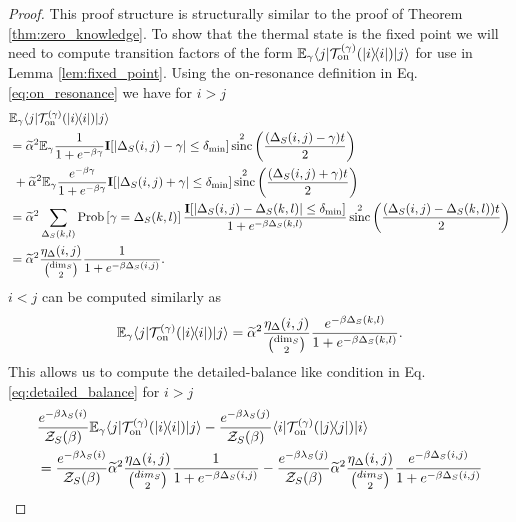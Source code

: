 \documentclass[
 amsmath,amssymb,
 aps,
onecolumn, 
nofootinbib]{revtex4-2}
\newcommand{\on}{\rm on}
\newcommand{\ket}[1]{|#1\rangle}
\newcommand{\bra}[1]{\langle #1|}
\newcommand{\ketbra}[2]{| #1\rangle\! \langle #2|}
\newcommand{\EE}{\mathbb{E}}
\newcommand{\TT}{\mathcal{T}}
\newcommand{\prob}[1]{{\rm Prob}\left[ #1 \right]}
\newcommand{\partfun}{\mathcal{Z}}
\DeclareMathOperator{\sinc}{sinc}
\begin{document}
\begin{proof}
This proof structure is structurally similar to the proof of Theorem \ref{thm:zero_knowledge}.
To show that the thermal state is the fixed point we will need to compute transition factors of the form $\EE_\gamma \bra{j}\TT_{\on}^{(\gamma)}(\ketbra{i}{i})\ket{j}$ for use in Lemma \ref{lem:fixed_point}. Using the on-resonance definition in Eq. \eqref{eq:on_resonance} we have for $i > j$
\begin{align}
    &\EE_\gamma \bra{j} \TT_{\on}^{(\gamma)}(\ketbra{i}{i})\ket{j} \nonumber \\
    &=  \widetilde{\alpha}^2 \EE_{\gamma} \frac{1}{1 + e^{-\beta \gamma}} \mathbf{I}[|\Delta_S(i,j) - \gamma| \le \delta_{\min}]  \sinc^2\left(\frac{(\Delta_S(i,j) - \gamma)t}{2}\right) \nonumber \\
    &~+ \widetilde{\alpha}^2 \EE_{\gamma} \frac{e^{-\beta \gamma}}{1 + e^{-\beta \gamma}} \mathbf{I}[|\Delta_S(i,j) + \gamma| \le \delta_{\min}]  \sinc^2\left(\frac{(\Delta_S(i,j) + \gamma)t}{2}\right) \\
    &= \widetilde{\alpha}^2 \sum_{\Delta_S(k,l)} \prob{\gamma = \Delta_S(k,l)} \frac{\mathbf{I}[|\Delta_S(i,j) - \Delta_S(k,l)| \le \delta_{\min}]}{1 + e^{-\beta \Delta_S(k,l)}}   \sinc^2\left(\frac{(\Delta_S(i,j) - \Delta_S(k,l))t}{2}\right) \\
    &= \widetilde{\alpha}^2 \frac{\eta_\Delta(i,j)}{\binom{\dim_S}{2}} \frac{1}{1 + e^{-\beta \Delta_S(i,j)}}.
\end{align}
$i < j$ can be computed similarly as
\begin{equation}
    \EE_\gamma \bra{j} \TT_{\on}^{(\gamma)}(\ketbra{i}{i})\ket{j} = \widetilde{\alpha}^2 \frac{\eta_\Delta(i,j)}{\binom{\dim_S}{2}} \frac{e^{-\beta \Delta_S(k,l)}}{1 + e^{-\beta \Delta_S(k,l)}}.
\end{equation}
This allows us to compute the detailed-balance like condition in Eq. \eqref{eq:detailed_balance} for $i > j$
\begin{align}
    &\frac{e^{-\beta \lambda_S(i)}}{\partfun_S(\beta)} \EE_\gamma \bra{j} \TT_{\on}^{(\gamma)}(\ketbra{i}{i}) \ket{j} - \frac{e^{-\beta \lambda_S(j)}}{\partfun_S(\beta)} \bra{i} \TT_{\on}^{(\gamma)}(\ketbra{j}{j}) \ket{i} \nonumber \\
    &= \frac{e^{-\beta \lambda_S(i)}}{\partfun_S(\beta)} \widetilde{\alpha}^2 \frac{\eta_\Delta(i,j)}{\binom{dim_S}{2}} \frac{1}{1 + e^{-\beta \Delta_S(i,j)}} - \frac{e^{-\beta \lambda_S(j)}}{\partfun_S(\beta)} \widetilde{\alpha}^2 \frac{\eta_\Delta(i,j)}{\binom{dim_S}{2}} \frac{e^{-\beta \Delta_S(i,j)}}{1 + e^{-\beta \Delta_S(i,j)}} \\

\end{align}
\end{proof}
\end{document}
